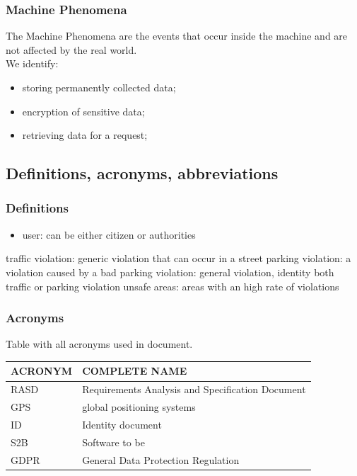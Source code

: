 \documentclass{article}
\begin{document}
\subsubsection{Machine Phenomena}
The Machine Phenomena are the events that occur inside the machine and are not affected by the real world.
\\We identify:
\begin{itemize}
    \item storing permanently collected data;
    \item encryption of sensitive data;
    \item retrieving data for a request; 
\end{itemize} 

\subsection{Definitions, acronyms, abbreviations}

\subsubsection{Definitions}
\begin{itemize}
    \item user: can be either citizen or authorities
\end{itemize}
traffic violation: generic violation that can occur in a street
parking violation: a violation caused by a bad parking
violation: general violation, identity both traffic or parking violation
unsafe areas: areas with an high rate of violations

\subsubsection{Acronyms}
Table with all acronyms used in document.
\begin{center}
\begin{tabular}{ | l | l |}
    \hline
    ACRONYM & COMPLETE NAME \\
    \hline
    RASD & Requirements Analysis and Specification Document \\
    \hline
    GPS & global positioning systems \\
    \hline
    ID & Identity document \\
    \hline
    S2B & Software to be \\
    \hline
    GDPR & General Data Protection Regulation \\
    \hline 
\end{tabular}
\end{center}
\end{document}
